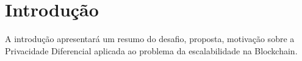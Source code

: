\chapter{Introdução}



A introdução apresentará um resumo do desafio, proposta, motivação sobre a Privacidade Diferencial aplicada ao problema da escalabilidade na Blockchain.




